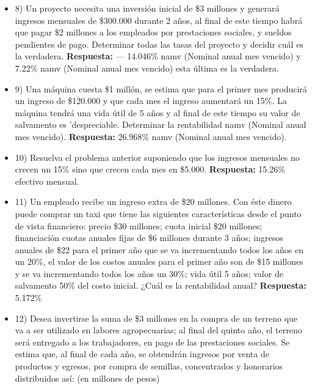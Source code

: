 \begin{itemize}
	\item 8) Un proyecto necesita una inversión inicial de \$3 millones y generará ingresos mensuales de \$300.000 durante 2 años, al final de este tiempo habrá que pagar \$2 millones a los empleados por prestaciones sociales, y sueldos pendientes de pago. Determinar todas las tasas del proyecto y decidir cuál es la verdadera.
	      \textbf{ Respuesta:}  — 14.046\% namv (Nominal anual mes vencido) y 7.22\% namv (Nominal anual mes vencido) esta última es la verdadera.
	      
	\item 9) Una máquina cuesta \$1 millón, se estima que para el primer mes producirá un ingreso de \$120.000 y que cada mes el ingreso aumentará un 15\%. La máquina tendrá una vida útil de 5 años y al final de este tiempo su valor de salvamento es 'despreciable. Determinar la rentabilidad namv (Nominal anual mes vencido).
	      \textbf{ Respuesta:} 26.968\% namv (Nominal anual mes vencido).
	      
	\item 10) Resuelva el problema anterior suponiendo que los ingresos mensuales no crecen un 15\% sino que crecen cada mes en \$5.000.
	      \textbf{ Respuesta:} 15.26\% efectivo mensual.
	      
	\item 11) Un empleado recibe un ingreso extra de \$20 millones. Con éste dinero puede comprar un taxi que tiene las siguientes características desde el punto de vista financiero: precio \$30 millones; cuota inicial \$20 millones; financiación cuotas anuales fijas de \$6 millones durante 3 años; ingresos anuales de \$22 para el primer año que se va incrementando todos los años en un 20\%, el valor de los costos anuales para el primer año son de \$15 millones y se va incrementando todos los años un 30\%; vida útil 5 años; valor de salvamento 50\% del costo inicial. ¿Cuál es la rentabilidad anual?
	      \textbf{ Respuesta:} 5.172\%
	      
	\item 12) Desea invertirse la suma de \$3 millones en la compra de un terreno que va a ser utilizado en labores agropecuarias; al final del quinto año, el terreno será entregado a los trabajadores, en pago de las prestaciones sociales. Se estima que, al final de cada año, se obtendrán ingresos por venta de productos y egresos, por compra de semillas, concentrados y honorarios distribuidos así: (en millones de pesos)
	      

\end{itemize}
